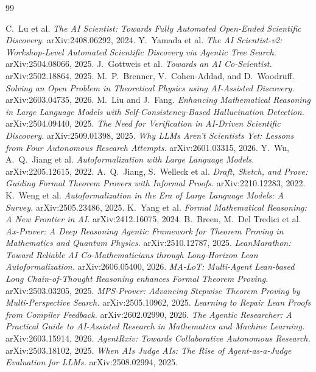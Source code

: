 \documentclass[11pt]{article}
\begin{document}
\begin{thebibliography}{99}

 C.~Lu et al. \emph{The AI Scientist: Towards Fully Automated Open-Ended Scientific Discovery.} arXiv:2408.06292, 2024.
 Y.~Yamada et al. \emph{The AI Scientist-v2: Workshop-Level Automated Scientific Discovery via Agentic Tree Search.} arXiv:2504.08066, 2025.
 J.~Gottweis et al. \emph{Towards an AI Co-Scientist.} arXiv:2502.18864, 2025.
 M.~P.~Brenner, V.~Cohen-Addad, and D.~Woodruff. \emph{Solving an Open Problem in Theoretical Physics using AI-Assisted Discovery.} arXiv:2603.04735, 2026.
 M.~Liu and J.~Fang. \emph{Enhancing Mathematical Reasoning in Large Language Models with Self-Consistency-Based Hallucination Detection.} arXiv:2504.09440, 2025.
 \emph{The Need for Verification in AI-Driven Scientific Discovery.} arXiv:2509.01398, 2025.
 \emph{Why LLMs Aren't Scientists Yet: Lessons from Four Autonomous Research Attempts.} arXiv:2601.03315, 2026.
 Y.~Wu, A.~Q.~Jiang et al. \emph{Autoformalization with Large Language Models.} arXiv:2205.12615, 2022.
 A.~Q.~Jiang, S.~Welleck et al. \emph{Draft, Sketch, and Prove: Guiding Formal Theorem Provers with Informal Proofs.} arXiv:2210.12283, 2022.
 K.~Weng et al. \emph{Autoformalization in the Era of Large Language Models: A Survey.} arXiv:2505.23486, 2025.
 K.~Yang et al. \emph{Formal Mathematical Reasoning: A New Frontier in AI.} arXiv:2412.16075, 2024.
 B.~Breen, M.~Del Tredici et al. \emph{Ax-Prover: A Deep Reasoning Agentic Framework for Theorem Proving in Mathematics and Quantum Physics.} arXiv:2510.12787, 2025.
 \emph{LeanMarathon: Toward Reliable AI Co-Mathematicians through Long-Horizon Lean Autoformalization.} arXiv:2606.05400, 2026.
 \emph{MA-LoT: Multi-Agent Lean-based Long Chain-of-Thought Reasoning enhances Formal Theorem Proving.} arXiv:2503.03205, 2025.
 \emph{MPS-Prover: Advancing Stepwise Theorem Proving by Multi-Perspective Search.} arXiv:2505.10962, 2025.
 \emph{Learning to Repair Lean Proofs from Compiler Feedback.} arXiv:2602.02990, 2026.
 \emph{The Agentic Researcher: A Practical Guide to AI-Assisted Research in Mathematics and Machine Learning.} arXiv:2603.15914, 2026.
 \emph{AgentRxiv: Towards Collaborative Autonomous Research.} arXiv:2503.18102, 2025.
 \emph{When AIs Judge AIs: The Rise of Agent-as-a-Judge Evaluation for LLMs.} arXiv:2508.02994, 2025.

\end{thebibliography}
\end{document}
